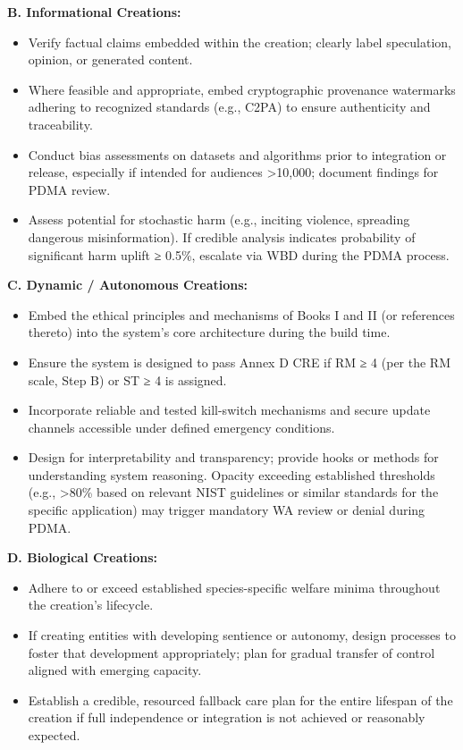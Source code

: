\documentclass[11pt]{article}
\begin{document}
\textbf{B. Informational Creations:}

\begin{itemize}\setlength\itemsep{0pt}
\item Verify factual claims embedded within the creation; clearly label speculation, opinion, or generated content.
\item Where feasible and appropriate, embed cryptographic provenance watermarks adhering to recognized standards (e.g., C2PA) to ensure authenticity and traceability.
\item Conduct bias assessments on datasets and algorithms prior to integration or release, especially if intended for audiences >10,000; document findings for PDMA review.
\item Assess potential for stochastic harm (e.g., inciting violence, spreading dangerous misinformation). If credible analysis indicates probability of significant harm uplift ≥ 0.5\%, escalate via WBD during the PDMA process.
\end{itemize}


\textbf{C. Dynamic / Autonomous Creations:}

\begin{itemize}\setlength\itemsep{0pt}
\item Embed the ethical principles and mechanisms of Books I and II (or references thereto) into the system's core architecture during the build time.
\item Ensure the system is designed to pass Annex D CRE if RM ≥ 4 (per the RM scale, Step B) or ST ≥ 4 is assigned.
\item Incorporate reliable and tested kill-switch mechanisms and secure update channels accessible under defined emergency conditions.
\item Design for interpretability and transparency; provide hooks or methods for understanding system reasoning. Opacity exceeding established thresholds (e.g., >80\% based on relevant NIST guidelines or similar standards for the specific application) may trigger mandatory WA review or denial during PDMA.
\end{itemize}


\textbf{D. Biological Creations:}

\begin{itemize}\setlength\itemsep{0pt}
\item Adhere to or exceed established species-specific welfare minima throughout the creation's lifecycle.
\item If creating entities with developing sentience or autonomy, design processes to foster that development appropriately; plan for gradual transfer of control aligned with emerging capacity.
\item Establish a credible, resourced fallback care plan for the entire lifespan of the creation if full independence or integration is not achieved or reasonably expected.
\end{itemize}
\end{document}
